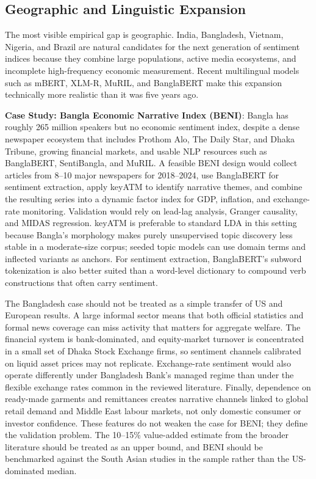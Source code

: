 \documentclass[12pt,oneside]{article}
\begin{document}
\subsection{Geographic and Linguistic Expansion}

The most visible empirical gap is geographic. India, Bangladesh, Vietnam, Nigeria, and Brazil are natural candidates for the next generation of sentiment indices because they combine large populations, active media ecosystems, and incomplete high-frequency economic measurement. Recent multilingual models such as mBERT, XLM-R, MuRIL, and BanglaBERT make this expansion technically more realistic than it was five years ago.

\textbf{Case Study: Bangla Economic Narrative Index (BENI)}: Bangla has roughly 265 million speakers but no economic sentiment index, despite a dense newspaper ecosystem that includes Prothom Alo, The Daily Star, and Dhaka Tribune, growing financial markets, and usable NLP resources such as BanglaBERT, SentiBangla, and MuRIL. A feasible BENI design would collect articles from 8--10 major newspapers for 2018--2024, use BanglaBERT for sentiment extraction, apply keyATM to identify narrative themes, and combine the resulting series into a dynamic factor index for GDP, inflation, and exchange-rate monitoring. Validation would rely on lead-lag analysis, Granger causality, and MIDAS regression. keyATM is preferable to standard LDA in this setting because Bangla's morphology makes purely unsupervised topic discovery less stable in a moderate-size corpus; seeded topic models can use domain terms and inflected variants as anchors. For sentiment extraction, BanglaBERT's subword tokenization is also better suited than a word-level dictionary to compound verb constructions that often carry sentiment.

The Bangladesh case should not be treated as a simple transfer of US and European results. A large informal sector means that both official statistics and formal news coverage can miss activity that matters for aggregate welfare. The financial system is bank-dominated, and equity-market turnover is concentrated in a small set of Dhaka Stock Exchange firms, so sentiment channels calibrated on liquid asset prices may not replicate. Exchange-rate sentiment would also operate differently under Bangladesh Bank's managed regime than under the flexible exchange rates common in the reviewed literature. Finally, dependence on ready-made garments and remittances creates narrative channels linked to global retail demand and Middle East labour markets, not only domestic consumer or investor confidence. These features do not weaken the case for BENI; they define the validation problem. The 10--15\% value-added estimate from the broader literature should be treated as an upper bound, and BENI should be benchmarked against the South Asian studies in the sample rather than the US-dominated median.
\end{document}
